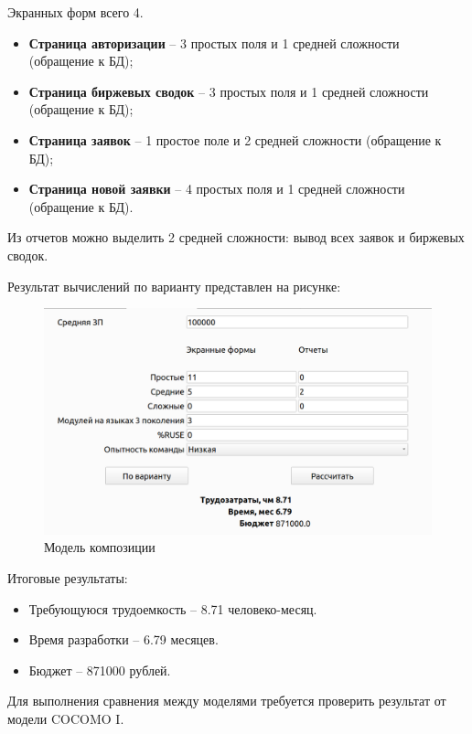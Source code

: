 Экранных форм всего 4.

\begin{itemize}
	\item \textbf{Страница авторизации} -- 3 простых поля и 1 средней сложности (обращение к БД);
	\item \textbf{Страница биржевых сводок} -- 3 простых поля и 1 средней сложности (обращение к БД);
	\item \textbf{Страница заявок} -- 1 простое поле и 2 средней сложности (обращение к БД);
	\item \textbf{Страница новой заявки} -- 4 простых поля и 1 средней сложности (обращение к БД).
\end{itemize}

Из отчетов можно выделить 2 средней сложности: вывод всех заявок и биржевых сводок.

Результат вычислений по варианту представлен на рисунке:
\FloatBarrier
\begin{figure}[h]	
	\begin{center}
		\includegraphics[width=\linewidth]{inc/comp.png}
	\end{center}
	\captionsetup{justification=centering}
	\caption{Модель композиции}
\end{figure}
\FloatBarrier 

Итоговые результаты:
\begin{itemize}
	\item Требующуюся трудоемкость -- 8.71 человеко-месяц.
	\item Время разработки -- 6.79 месяцев.
	\item Бюджет -- 871000 рублей.
\end{itemize}

Для выполнения сравнения между моделями требуется проверить результат от модели COCOMO I.

